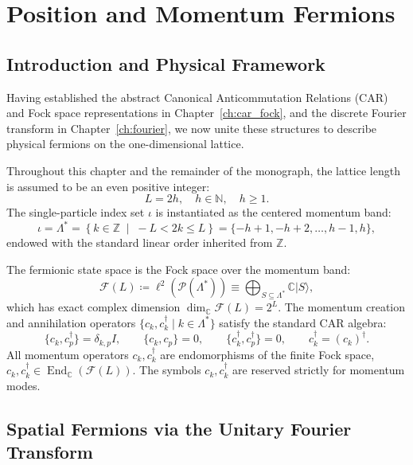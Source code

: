 \chapter{Position and Momentum Fermions}
\label{ch:fermions}

\section{Introduction and Physical Framework}

Having established the abstract Canonical Anticommutation Relations (CAR) and Fock space representations in Chapter~\ref{ch:car_fock}, and the discrete Fourier transform in Chapter~\ref{ch:fourier}, we now unite these structures to describe physical fermions on the one-dimensional lattice.

Throughout this chapter and the remainder of the monograph, the lattice length is assumed to be an even positive integer:
\begin{equation}
L = 2h, \quad h \in \mathbb{N}, \quad h \ge 1.
\end{equation}
The single-particle index set $\iota$ is instantiated as the centered momentum band:
\begin{equation}
\iota = \Lambda^* = \left\{ k \in \mathbb{Z} \;\middle|\; -L < 2k \le L \right\} = \{-h+1, -h+2, \dots, h-1, h\},
\end{equation}
endowed with the standard linear order inherited from $\mathbb{Z}$. 

The fermionic state space is the Fock space over the momentum band:
\begin{equation}
\mathcal{F}(L) \coloneqq \ell^2(\mathcal{P}(\Lambda^*)) \equiv \bigoplus_{S \subseteq \Lambda^*} \mathbb{C} |S\rangle,
\end{equation}
which has exact complex dimension $\dim_{\mathbb{C}} \mathcal{F}(L) = 2^L$. The momentum creation and annihilation operators $\{c_k, c_k^\dagger \mid k \in \Lambda^*\}$ satisfy the standard CAR algebra:
\begin{equation}
\{c_k, c_p^\dagger\} = \delta_{k, p} I, \qquad \{c_k, c_p\} = 0, \qquad \{c_k^\dagger, c_p^\dagger\} = 0, \qquad c_k^\dagger = (c_k)^\dagger.
\end{equation}
All momentum operators $c_k,c_k^\dagger$ are endomorphisms of the finite Fock space, $c_k,c_k^\dagger\in\operatorname{End}_{\mathbb C}(\mathcal F(L))$. The symbols $c_k,c_k^\dagger$ are reserved strictly for momentum modes.

\section{Spatial Fermions via the Unitary Fourier Transform}


